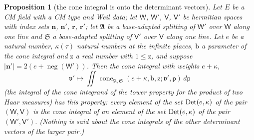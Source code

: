 \documentclass[11pt,a4paper]{article}
\theoremstyle{plainx}
\newtheorem{proposition}[theorem]{Proposition}
\theoremstyle{uprightx}
\newcommand{\bn}{\mathbf{n}}
\newcommand{\br}{\mathbf{r}}
\newcommand{\sW}{\mathsf{W}}
\newcommand{\sV}{\mathsf{V}}
\newcommand{\fv}{\mathfrak{v}}
\newcommand{\fS}{\mathfrak{S}}
\newcommand{\fA}{\mathfrak{A}}
\newcommand{\negc}{\operatorname{neg}}
\begin{document}
\begin{proposition}[the cone integral is onto the determinant vectors]\label{p:cone}
Let $E$ be a CM field with a CM type and Weil data; let $\sW$, $\sW'$, $\sV$, $\sV'$ be hermitian spaces with
index sets $\bn$, $\bn'$, $\br$, $\br'$; let $\fA$ be a base-adapted splitting of $\sW'$ over $\sW$ along one line
and $\fS$ a base-adapted splitting of $\sV'$ over $\sV$ along one line. Let $e$ be a natural number, $\kappa(\tau)$
natural numbers at the infinite places, $\mathrm{b}$ a parameter of the cone integral and $\mathrm{z}$ a real
number with $1\le\mathrm{z}$, and suppose $|\bn'|=2(e+\negc(\sW'))$. Then the cone integral with weights $e+\kappa$,
\[\fv'\longmapsto\iint\operatorname{cone}_{\fA,\fS}(e+\kappa,\mathrm{b},\mathrm{z};\fv',\mathsf{p})\,d\mathsf{p}\]
(the integral of the cone integrand of the tower property for the product of two Haar measures) has this
property: every element of the set $\operatorname{Det}(e,\kappa)$ of the pair $(\sW,\sV)$ is the cone integral of an element
of the set $\operatorname{Det}(e,\kappa)$ of the pair $(\sW',\sV')$. (Nothing is said about the cone integrals of the other
determinant vectors of the larger pair.)
\end{proposition}
\end{document}
